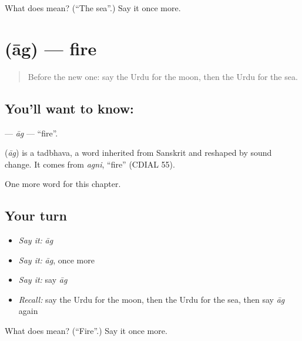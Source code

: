 \begin{tcolorbox}[breakable,colback=teal!4,colframe=teal!35!black,title={Before you move on}]
What does  mean? (\textquotedblleft{}The sea\textquotedblright{}.) Say it once more.
\end{tcolorbox}
\section[\texorpdfstring{\ur{آگ} (āg)}{آگ (āg)}]{ (āg) — fire}

\label{lesson:UR-C66-ag}



\begin{quote}
Before the new one: say the Urdu for the moon, then the Urdu for the sea.
\end{quote}

\subsection*{You'll want to know: }
\textbf{} — \emph{āg} — \textquotedblleft{}fire\textquotedblright{}.

\begin{cousinweb}
\textbf{} (\emph{āg}) is a tadbhava, a word inherited from Sanskrit and reshaped by sound change. It comes from \emph{agni}, \textquotedblleft{}fire\textquotedblright{} (CDIAL 55).
\end{cousinweb}

\begin{grammarlens}[title={What you've built}]
One more word for this chapter.
\end{grammarlens}

\subsection*{Your turn}
\begin{itemize}
\raggedright
  \item \emph{Say it:} \emph{āg}
  \item \emph{Say it:} \emph{āg}, once more
  \item \emph{Say it:} say \emph{āg}
  \item \emph{Recall:} say the Urdu for the moon, then the Urdu for the sea, then say \emph{āg} again
\end{itemize}

\begin{tcolorbox}[breakable,colback=teal!4,colframe=teal!35!black,title={Before you move on}]
What does  mean? (\textquotedblleft{}Fire\textquotedblright{}.) Say it once more.
\end{tcolorbox}
